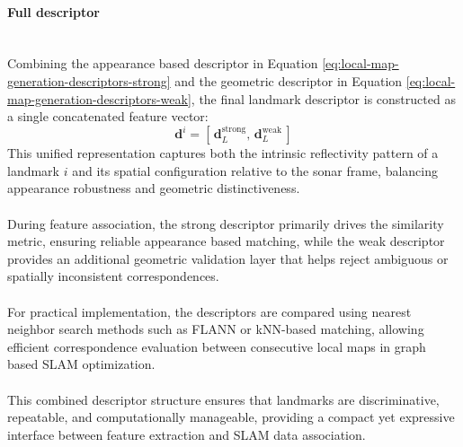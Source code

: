 \newpage

\paragraph{Full descriptor} \mbox{}\\[0.5em] \noindent
Combining the appearance based descriptor in Equation \ref{eq:local-map-generation-descriptors-strong} and the geometric descriptor in Equation \ref{eq:local-map-generation-descriptors-weak}, the final landmark descriptor is constructed as a single concatenated feature vector:
\begin{equation}
    \mathbf{d}^i = [\, \mathbf{d}_L^{\text{strong}},\, \mathbf{d}_L^{\text{weak}} \,]
    \label{eq:local-map-generation-descriptor}
\end{equation}
This unified representation captures both the intrinsic reflectivity pattern of a landmark $i$ and its spatial configuration relative to the sonar frame, balancing appearance robustness and geometric distinctiveness.  
\\ \\
During feature association, the strong descriptor primarily drives the similarity metric, ensuring reliable appearance based matching, while the weak descriptor provides an additional geometric validation layer that helps reject ambiguous or spatially inconsistent correspondences.  
\\ \\
For practical implementation, the descriptors are compared using nearest neighbor search methods such as FLANN or kNN-based matching, allowing efficient correspondence evaluation between consecutive local maps in graph based SLAM optimization.  
\\ \\
This combined descriptor structure ensures that landmarks are discriminative, repeatable, and computationally manageable, providing a compact yet expressive interface between feature extraction and SLAM data association.



